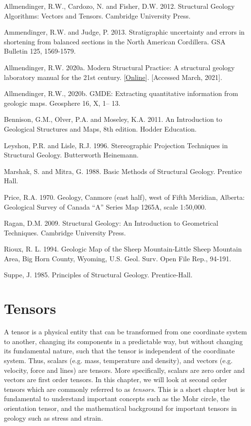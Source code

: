 \documentclass[a4paper , 12pt]{book}
\begin{document}
Allmendinger, R.W., Cardozo, N. and Fisher, D.W. 2012. Structural Geology Algorithms: Vectors and Tensors. Cambridge University Press.

Ammendinger, R.W. and Judge, P. 2013. Stratigraphic uncertainty and errors in shortening from balanced sections in the North American Cordillera. GSA Bulletin 125, 1569-1579.

Allmendinger, R.W. 2020a. Modern Structural Practice: A structural geology laboratory manual for the 21st century. [\href{https://www.rickallmendinger.net/download}{Online}]. [Accessed March, 2021].

Allmendinger, R.W., 2020b. GMDE: Extracting quantitative information from geologic maps. Geosphere 16, X, 1– 13.

Bennison, G.M., Olver, P.A. and Moseley, K.A. 2011. An Introduction to Geological Structures and Maps, 8th edition. Hodder Education.

Leyshon, P.R. and Lisle, R.J. 1996. Stereographic Projection Techniques in Structural Geology. Butterworth Heinemann.

Marshak, S. and Mitra, G. 1988. Basic Methods of Structural Geology. Prentice Hall.

Price, R.A. 1970. Geology, Canmore (east half), west of Fifth Meridian, Alberta: Geological Survey of Canada “A” Series Map 1265A, scale 1:50,000.

Ragan, D.M. 2009. Structural Geology: An Introduction to Geometrical Techniques. Cambridge University Press.

Rioux, R. L. 1994. Geologic Map of the Sheep Mountain‐Little Sheep Mountain Area, Big Horn County, Wyoming, U.S. Geol. Surv. Open File Rep., 94‐191.

Suppe, J. 1985. Principles of Structural Geology. Prentice-Hall.

\chapter{Tensors}

A tensor is a physical entity that can be transformed from one coordinate system to another, changing its components in a predictable way, but without changing its fundamental nature, such that the tensor is independent of the coordinate system. Thus, scalars (e.g. mass, temperature and density), and vectors (e.g. velocity, force and lines) are tensors. More specifically, scalars are zero order and vectors are first order tensors. In this chapter, we will look at second order tensors which are commonly referred to as \textit{tensors}. This is a short chapter but is fundamental to understand important concepts such as the Mohr circle, the orientation tensor, and the mathematical background for important tensors in geology such as stress and strain.
\end{document}
